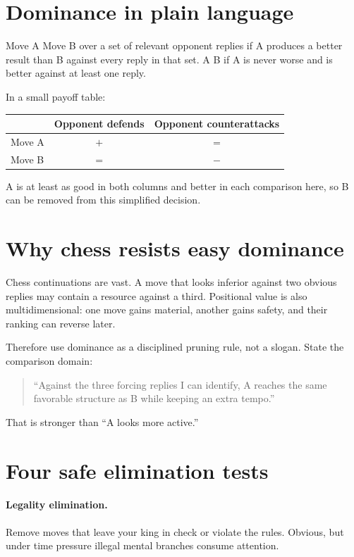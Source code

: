 \section{Dominance in plain language}
Move A  Move B over a set of relevant opponent replies if A produces a better result than B against every reply in that set. A  B if A is never worse and is better against at least one reply.

In a small payoff table:

\begin{center}
\begin{tabular}{lcc}
\toprule
& Opponent defends & Opponent counterattacks\\
\midrule
Move A & $+$ & $=$\\
Move B & $=$ & $-$\\
\bottomrule
\end{tabular}
\end{center}

A is at least as good in both columns and better in each comparison here, so B can be removed from this simplified decision.

\section{Why chess resists easy dominance}
Chess continuations are vast. A move that looks inferior against two obvious replies may contain a resource against a third. Positional value is also multidimensional: one move gains material, another gains safety, and their ranking can reverse later.

Therefore use dominance as a disciplined pruning rule, not a slogan. State the comparison domain:

\begin{quote}
``Against the three forcing replies I can identify, A reaches the same favorable structure as B while keeping an extra tempo.''
\end{quote}

That is stronger than ``A looks more active.''

\section{Four safe elimination tests}
\paragraph{Legality elimination.} Remove moves that leave your king in check or violate the rules. Obvious, but under time pressure illegal mental branches consume attention.


